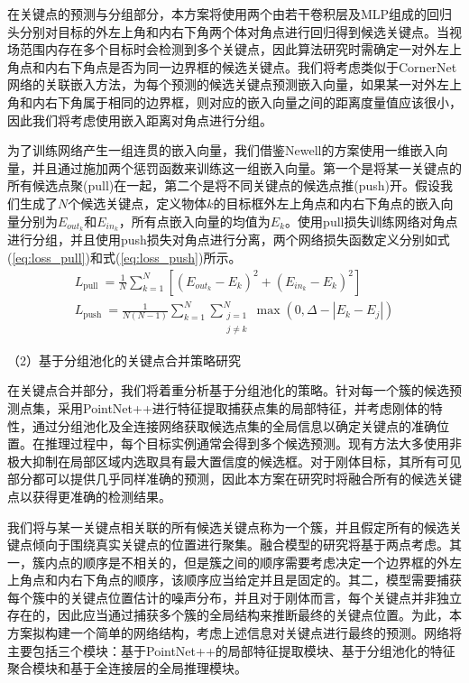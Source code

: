 \documentclass[12pt]{article}
\begin{document}
在关键点的预测与分组部分，本方案将使用两个由若干卷积层及MLP组成的回归头分别对目标的外左上角和内右下角两个体对角点进行回归得到候选关键点。当视场范围内存在多个目标时会检测到多个关键点，因此算法研究时需确定一对外左上角点和内右下角点是否为同一边界框的候选关键点。我们将考虑类似于CornerNet网络的关联嵌入方法，为每个预测的候选关键点预测嵌入向量，如果某一对外左上角和内右下角属于相同的边界框，则对应的嵌入向量之间的距离度量值应该很小，因此我们将考虑使用嵌入距离对角点进行分组。

为了训练网络产生一组连贯的嵌入向量，我们借鉴Newell\cite{Newell2017}的方案使用一维嵌入向量，并且通过施加两个惩罚函数来训练这一组嵌入向量。第一个是将某一关键点的所有候选点聚(pull)在一起，第二个是将不同关键点的候选点推(push)开。假设我们生成了$N$个候选关键点，定义物体$k$的目标框外左上角点和内右下角点的嵌入向量分别为$E_{out_k}$和$E_{in_k}$，所有点嵌入向量的均值为$E_k$。使用pull损失训练网络对角点进行分组，并且使用push损失对角点进行分离，两个网络损失函数定义分别如式(\ref{eq:loss_pull})和式(\ref{eq:loss_push})所示。
\begin{gather}
L_{\text {pull }}=\frac{1}{N} \sum_{k=1}^N\left[\left(E_{out_k}-E_k\right)^2+\left(E_{in_k}-E_k\right)^2\right] 
\label{eq:loss_pull}
\\
L_{\text {push }}=\frac{1}{N(N-1)} \sum_{k=1}^N \sum_{\substack{j=1 \\
j \neq k}}^N \max \left(0, \Delta -\left|E_k-E_j\right|\right)
\label{eq:loss_push}
\end{gather}

（2）基于分组池化的关键点合并策略研究

在关键点合并部分，我们将着重分析基于分组池化的策略。针对每一个簇的候选预测点集，采用PointNet++进行特征提取捕获点集的局部特征，并考虑刚体的特性，通过分组池化及全连接网络获取候选点集的全局信息以确定关键点的准确位置。在推理过程中，每个目标实例通常会得到多个候选预测。现有方法大多使用非极大抑制在局部区域内选取具有最大置信度的候选框。对于刚体目标，其所有可见部分都可以提供几乎同样准确的预测，因此本方案在研究时将融合所有的候选关键点以获得更准确的检测结果。

我们将与某一关键点相关联的所有候选关键点称为一个簇，并且假定所有的候选关键点倾向于围绕真实关键点的位置进行聚集。融合模型的研究将基于两点考虑。其一，簇内点的顺序是不相关的，但是簇之间的顺序需要考虑决定一个边界框的外左上角点和内右下角点的顺序，该顺序应当给定并且是固定的。其二，模型需要捕获每个簇中的关键点位置估计的噪声分布，并且对于刚体而言，每个关键点并非独立存在的，因此应当通过捕获多个簇的全局结构来推断最终的关键点位置。为此，本方案拟构建一个简单的网络结构，考虑上述信息对关键点进行最终的预测。网络将主要包括三个模块：基于PointNet++的局部特征提取模块、基于分组池化的特征聚合模块和基于全连接层的全局推理模块。
\end{document}
